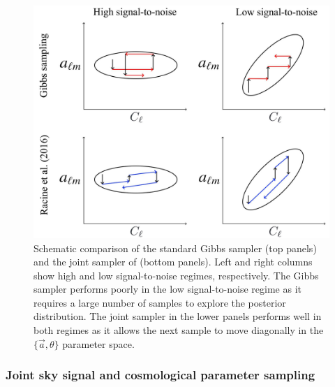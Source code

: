\documentclass[twocolumn]{aa}
\renewcommand{\a}[0]{\vec{a}}
\begin{document}
\begin{figure}
	\centering
	\includegraphics[width=\linewidth]{figures/parameter_degeneracy.jpg}
	\caption{\label{fig:illustration}Schematic comparison of the standard Gibbs sampler (top panels) and the joint sampler of \citet{racine:2016} (bottom panels). Left and right columns show high and low signal-to-noise regimes, respectively. The Gibbs sampler performs poorly in the low signal-to-noise regime as it requires a large number of samples to explore the posterior distribution. The joint sampler in the lower panels performs well in both regimes as it allows the next sample to move diagonally in the $\{\a, \theta\}$ parameter space.}
\end{figure}

\subsubsection{Joint sky signal and cosmological parameter sampling}
\label{sec:joint-sampling}
\end{document}
